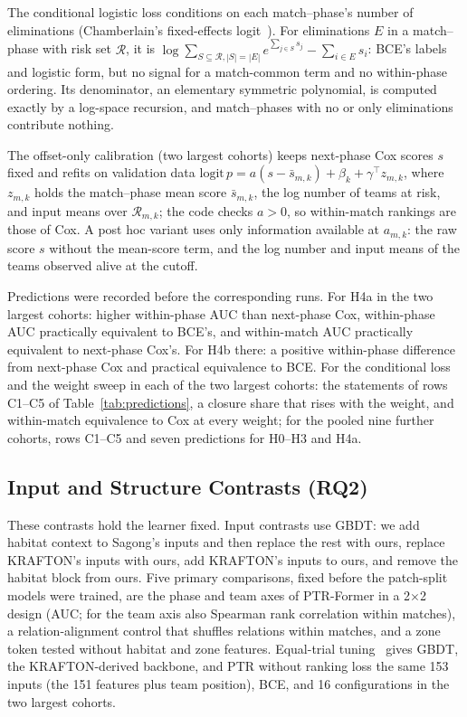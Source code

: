 \documentclass[sigconf,anonymous]{acmart}
\begin{document}
The conditional logistic loss conditions on each match--phase's number of eliminations (Chamberlain's fixed-effects logit~\cite{Chamberlain80}). For eliminations $E$ in a match--phase with risk set $\mathcal{R}$, it is $\log\sum_{S\subseteq\mathcal{R},|S|=|E|}e^{\sum_{j\in S}s_j}-\sum_{i\in E}s_i$: BCE's labels and logistic form, but no signal for a match-common term and no within-phase ordering. Its denominator, an elementary symmetric polynomial, is computed exactly by a log-space recursion, and match--phases with no or only eliminations contribute nothing.

The offset-only calibration (two largest cohorts) keeps next-phase Cox scores $s$ fixed and refits on validation data $\mathrm{logit}\,p=a(s-\bar s_{m,k})+\beta_k+\gamma^{\top}z_{m,k}$, where $z_{m,k}$ holds the match--phase mean score $\bar s_{m,k}$, the log number of teams at risk, and input means over $\mathcal{R}_{m,k}$; the code checks $a>0$, so within-match rankings are those of Cox. A post hoc variant uses only information available at $a_{m,k}$: the raw score $s$ without the mean-score term, and the log number and input means of the teams observed alive at the cutoff.

Predictions were recorded before the corresponding runs. For H4a in the two largest cohorts: higher within-phase AUC than next-phase Cox, within-phase AUC practically equivalent to BCE's, and within-match AUC practically equivalent to next-phase Cox's. For H4b there: a positive within-phase difference from next-phase Cox and practical equivalence to BCE. For the conditional loss and the weight sweep in each of the two largest cohorts: the statements of rows C1--C5 of Table~\ref{tab:predictions}, a closure share that rises with the weight, and within-match equivalence to Cox at every weight; for the pooled nine further cohorts, rows C1--C5 and seven predictions for H0--H3 and H4a.

\subsection{Input and Structure Contrasts (RQ2)}
\label{sec:method:contrasts}
These contrasts hold the learner fixed. Input contrasts use GBDT: we add habitat context to Sagong's inputs and then replace the rest with ours, replace KRAFTON's inputs with ours, add KRAFTON's inputs to ours, and remove the habitat block from ours. Five primary comparisons, fixed before the patch-split models were trained, are the phase and team axes of PTR-Former in a 2$\times$2 design (AUC; for the team axis also Spearman rank correlation within matches), a relation-alignment control that shuffles relations within matches, and a zone token tested without habitat and zone features. Equal-trial tuning~\cite{Bergstra12,Cawley10} gives GBDT, the KRAFTON-derived backbone, and PTR without ranking loss the same 153 inputs (the 151 features plus team position), BCE, and 16 configurations in the two largest cohorts.
\end{document}
